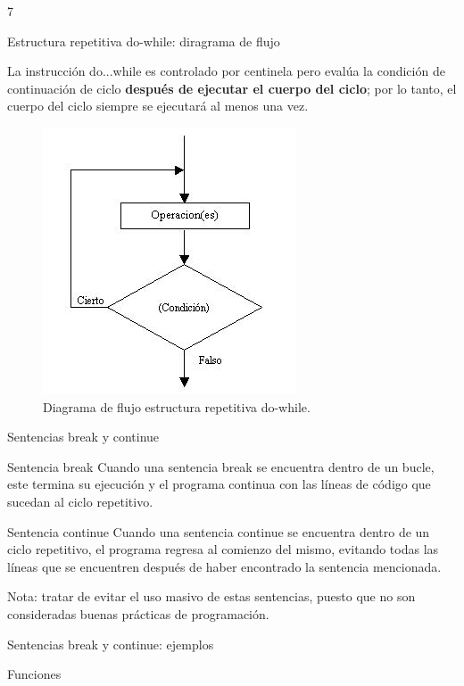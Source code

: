 7\documentclass[xcolor=pdftex,table,11pt]{beamer}
\begin{document}
\begin{frame}{Estructura repetitiva do-while: diragrama de flujo}
\begin{block}{}
La instrucción do...while es controlado por centinela pero evalúa la condición de continuación de ciclo \textbf{después de ejecutar el cuerpo del ciclo}; por lo tanto, el cuerpo del ciclo siempre se ejecutará al menos una vez.
\end{block}


\begin{figure}
 \centering
\includegraphics[scale=0.5]{../img/exported/do_while.jpg}
\caption{Diagrama de flujo estructura repetitiva do-while.}
\end{figure}

\end{frame}

\begin{frame}
\codesetstylefrombeamer
{}
\end{frame}

\begin{frame}{Sentencias break y continue}
\begin{block}{Sentencia break}
Cuando una sentencia break se encuentra dentro de un bucle, este termina su ejecución y el programa continua con las líneas de código que sucedan al ciclo repetitivo.
\end{block}

\begin{block}{Sentencia continue}
Cuando una sentencia continue se encuentra dentro de un ciclo repetitivo, el programa regresa al comienzo del mismo, evitando todas las líneas que se encuentren después de haber encontrado la sentencia mencionada. 
\end{block}

Nota: tratar de evitar el uso masivo de estas sentencias, puesto que no son consideradas buenas prácticas de programación.
\end{frame}


\begin{frame}{Sentencias break y continue: ejemplos}
\end{frame}

\begin{frame}{Funciones}
\end{frame}
\end{document}
